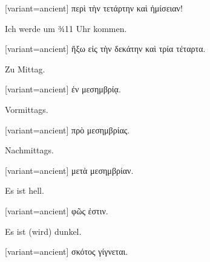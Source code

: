 \begin{greek}[variant=ancient]%
περὶ τὴν τετάρτην καὶ ἡμίσειαν!

\end{greek}%
\switchcolumn*

Ich werde um ¾11 Uhr kommen.

\switchcolumn

\begin{greek}[variant=ancient]%
ἥξω εἰς τὴν δεκάτην καὶ τρία τέταρτα.

\end{greek}%
\indent Zu Mittag.

\switchcolumn

\begin{greek}[variant=ancient]%
ἐν μεσημβρίᾳ.

\end{greek}%
\switchcolumn*

Vormittags.

\switchcolumn

\begin{greek}[variant=ancient]%
πρὸ μεσημβρίας.

\end{greek}%
\switchcolumn*

Nachmittags.

\switchcolumn

\begin{greek}[variant=ancient]%
μετὰ μεσημβρίαν.

\end{greek}%
\switchcolumn*

Es ist hell.

\switchcolumn

\begin{greek}[variant=ancient]%
φῶς ἐστιν.

\end{greek}%
\switchcolumn*

Es ist (wird) dunkel.

\switchcolumn

\begin{greek}[variant=ancient]%
σκότος γίγνεται.

\end{greek}%
\switchcolumn*


